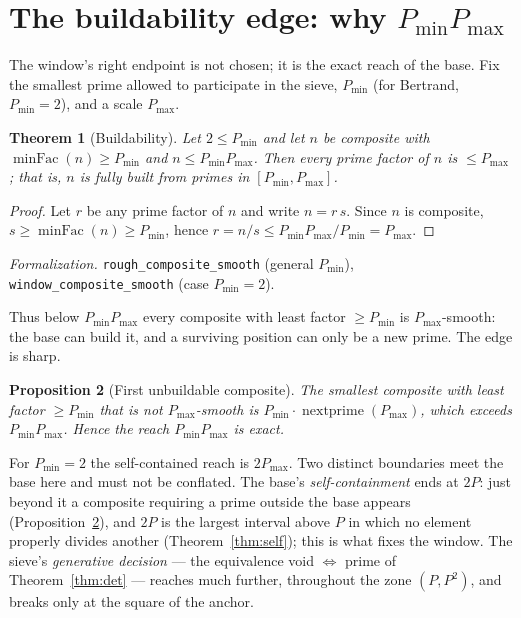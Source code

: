 \documentclass[11pt,a4paper]{amsart}
\theoremstyle{plain}
\newtheorem{theorem}{Theorem}[section]
\newtheorem{proposition}[theorem]{Proposition}
\theoremstyle{definition}
\theoremstyle{plain}
\theoremstyle{remark}
\newcommand{\lean}[1]{\textup{\texttt{#1}}}
\newcommand{\Formal}[1]{\par\smallskip\noindent\emph{Formalization.} #1\par\smallskip}
\begin{document}
\section{The buildability edge: why $P_{\min}P_{\max}$}
\label{sec:edge}

The window's right endpoint is not chosen; it is the exact reach of the base. Fix the
smallest prime allowed to participate in the sieve, $P_{\min}$ (for Bertrand,
$P_{\min}=2$), and a scale $P_{\max}$.

\begin{theorem}[Buildability]\label{thm:build}
Let $2\le P_{\min}$ and let $n$ be composite with $\operatorname{minFac}(n)\ge P_{\min}$
and $n\le P_{\min}P_{\max}$. Then every prime factor of $n$ is $\le P_{\max}$; that is, $n$
is fully built from primes in $[P_{\min},P_{\max}]$.
\end{theorem}

\begin{proof}
Let $r$ be any prime factor of $n$ and write $n=r\,s$. Since $n$ is composite,
$s\ge\operatorname{minFac}(n)\ge P_{\min}$, hence
$r=n/s\le P_{\min}P_{\max}/P_{\min}=P_{\max}$.
\end{proof}

\Formal{\lean{rough\_composite\_smooth} (general $P_{\min}$),
\lean{window\_composite\_smooth} (case $P_{\min}=2$).}

Thus below $P_{\min}P_{\max}$ every composite with least factor $\ge P_{\min}$ is
$P_{\max}$-smooth: the base can build it, and a surviving position can only be a new
prime. The edge is sharp.

\begin{proposition}[First unbuildable composite]\label{prop:first}
The smallest composite with least factor $\ge P_{\min}$ that is \emph{not}
$P_{\max}$-smooth is $P_{\min}\cdot\operatorname{nextprime}(P_{\max})$, which exceeds
$P_{\min}P_{\max}$. Hence the reach $P_{\min}P_{\max}$ is exact.
\end{proposition}

For $P_{\min}=2$ the self-contained reach is $2P_{\max}$. Two distinct boundaries meet the base
here and must not be conflated. The base's \emph{self-containment} ends at $2P$: just beyond it
a composite requiring a prime outside the base appears (Proposition~\ref{prop:first}), and $2P$
is the largest interval above $P$ in which no element properly divides another
(Theorem~\ref{thm:self}); this is what fixes the window. The sieve's \emph{generative decision}
--- the equivalence void $\Leftrightarrow$ prime of Theorem~\ref{thm:det} --- reaches much
further, throughout the zone $(P,P^2)$, and breaks only at the square of the anchor.
\end{document}

